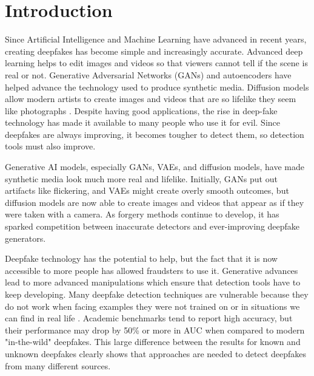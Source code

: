 \documentclass[conference]{IEEEtran}
\begin{document}
\section{Introduction}
Since Artificial Intelligence and Machine Learning have advanced in recent years, creating deepfakes has become simple and increasingly accurate. Advanced deep learning helps to edit images and videos so that viewers cannot tell if the scene is real or not. Generative Adversarial Networks (GANs) and autoencoders have helped advance the technology used to produce synthetic media. Diffusion models allow modern artists to create images and videos that are so lifelike they seem like photographs \cite{kaur2024deepfake}. Despite having good applications, the rise in deep-fake technology has made it available to many people who use it for evil. Since deepfakes are always improving, it becomes tougher to detect them, so detection tools must also improve. 

Generative AI models, especially GANs, VAEs, and diffusion models, have made synthetic media look much more real and lifelike. Initially, GANs put out artifacts like flickering, and VAEs might create overly smooth outcomes, but diffusion models are now able to create images and videos that appear as if they were taken with a camera. As forgery methods continue to develop, it has sparked competition between inaccurate detectors and ever-improving deepfake generators.



Deepfake technology has the potential to help, but the fact that it is now accessible to more people has allowed fraudsters to use it. Generative advances lead to more advanced manipulations which ensure that detection tools have to keep developing. Many deepfake detection techniques are vulnerable because they do not work when facing examples they were not trained on or in situations we can find in real life \cite{dissanayake2025review}. Academic benchmarks tend to report high accuracy, but their performance may drop by 50\% or more in AUC when compared to modern "in-the-wild" deepfakes. This large difference between the results for known and unknown deepfakes clearly shows that approaches are needed to detect deepfakes from many different sources.
\end{document}
